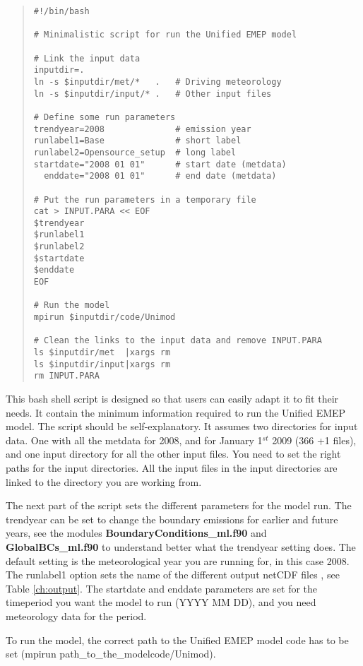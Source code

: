 \begin{quote}
\begin{verbatim}
#!/bin/bash

# Minimalistic script for run the Unified EMEP model

# Link the input data
inputdir=.
ln -s $inputdir/met/*   .   # Driving meteorology
ln -s $inputdir/input/* .   # Other input files

# Define some run parameters
trendyear=2008              # emission year
runlabel1=Base              # short label
runlabel2=Opensource_setup  # long label
startdate="2008 01 01"      # start date (metdata)
  enddate="2008 01 01"      # end date (metdata)

# Put the run parameters in a temporary file
cat > INPUT.PARA << EOF
$trendyear
$runlabel1
$runlabel2
$startdate
$enddate
EOF

# Run the model
mpirun $inputdir/code/Unimod

# Clean the links to the input data and remove INPUT.PARA
ls $inputdir/met  |xargs rm
ls $inputdir/input|xargs rm
rm INPUT.PARA

\end{verbatim}
\end{quote}
This bash shell script is designed so that users can easily 
adapt it to fit their needs. It contain the minimum information 
required to run the Unified EMEP model. 
The script should be self-explanatory. It assumes two directories for input data. 
One with all the metdata for 2008, and for January 1$^{st}$ 2009 (366 +1 files), 
and one input directory for all the other input files. You need to set the right paths 
for the input directories.  
All the input files in the input directories are linked to the directory you are working from. 
  

The next part of the script sets the different parameters for the model run. 
The trendyear can be set to change the boundary emissions for 
earlier and future years, see the modules {\bf BoundaryConditions\_ml.f90 } 
and {\bf GlobalBCs\_ml.f90 } to understand better what the trendyear 
setting does. The default setting is the meteorological year you are running for, 
in this case 2008. 
The runlabel1 option sets the name of the different output netCDF 
files , see Table \ref{ch:output}. 
The startdate and enddate parameters are set for the timeperiod you want the model 
to run (YYYY MM DD), and you need meteorology data for the period.

To run the model, the correct path  to the Unified EMEP model code 
has to be set (mpirun path\_to\_the\_modelcode/Unimod).  

